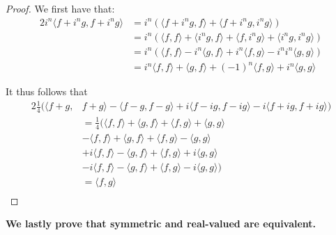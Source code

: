 \documentclass[10pt]{article}
\begin{document}
\begin{proof}

    We first have that:
    \begin{alignat*}{2}
        i^n\langle f+i^ng,f+i^ng\rangle &= i^n(\langle f+i^ng,f\rangle + \langle f+i^ng, i^ng\rangle)\\
        &=i^n(\langle f,f\rangle + \langle i^ng,f\rangle + \langle f,i^ng\rangle + \langle i^ng,i^ng\rangle)\\
        &= i^n(\langle f,f\rangle -i^n\langle g,f\rangle + i^n\langle f,g\rangle - i^ni^n\langle g,g\rangle)\\
        &= i^n\langle f,f\rangle +\langle g,f\rangle +(-1)^n\langle f,g\rangle + i^n\langle g,g\rangle
    \end{alignat*}

    It thus follows that
    \begin{alignat*}{2}
        \frac{1}{4}(\langle f+g,&f+g\rangle-\langle f-g,f-g\rangle + i\langle f-ig, f-ig\rangle -i\langle f+ig, f+ig\rangle)\\
        &=\frac{1}{4}(\langle f,f\rangle + \langle g,f\rangle + \langle f,g\rangle + \langle g,g\rangle\\
        & -\langle f,f\rangle + \langle g,f\rangle +\langle f,g\rangle -\langle g,g\rangle\\
        &+i\langle f,f\rangle - \langle g,f\rangle +\langle f,g\rangle +i\langle g,g\rangle\\
        &-i\langle f,f\rangle - \langle g,f\rangle + \langle f,g\rangle -i\langle g,g\rangle)\\
        &= \langle f,g\rangle\\
    \end{alignat*}
\end{proof}

\noindent
\textbf{We lastly prove that symmetric and real-valued are equivalent.}
\end{document}
